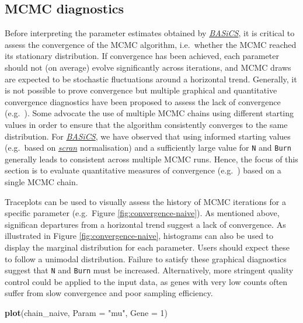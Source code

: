 \documentclass[9pt,a4paper,]{extarticle}
\newenvironment{Shaded}{\begin{snugshade}}{\end{snugshade}}
\newcommand{\DataTypeTok}[1]{\textcolor[rgb]{0.13,0.29,0.53}{#1}}
\newcommand{\DecValTok}[1]{\textcolor[rgb]{0.00,0.00,0.81}{#1}}
\newcommand{\KeywordTok}[1]{\textcolor[rgb]{0.13,0.29,0.53}{\textbf{#1}}}
\newcommand{\NormalTok}[1]{#1}
\newcommand{\StringTok}[1]{\textcolor[rgb]{0.31,0.60,0.02}{#1}}
\begin{document}
\hypertarget{mcmc-diagnostics}{%
\subsection{MCMC diagnostics}\label{mcmc-diagnostics}}

Before interpreting the parameter estimates obtained by \emph{\href{https://bioconductor.org/packages/3.11/BASiCS}{BASiCS}},
it is critical to assess the convergence of the MCMC algorithm, i.e.~whether
the MCMC reached its stationary distribution.
If convergence has been achieved, each parameter should not (on average) evolve
significantly across iterations, and MCMC draws are expected to be stochastic
fluctuations around a horizontal trend.
Generally, it is not possible to prove convergence but multiple graphical and
quantitative convergence diagnostics have been proposed to assess the lack
of convergence (e.g.~\citep{CowlesCarlin1996, BrooksGelman1998}).
Some advocate the use of multiple MCMC chains using different starting values in
order to ensure that the algorithm consistently converges to the same
distribution.
For \emph{\href{https://bioconductor.org/packages/3.11/BASiCS}{BASiCS}}, we have observed that using informed starting values
(e.g.~based on \emph{\href{https://bioconductor.org/packages/3.11/scran}{scran}} normalisation) and a sufficiently large
value for \texttt{N} and \texttt{Burn} generally leads to consistent across multiple MCMC runs.
Hence, the focus of this section is to evaluate quantitative measures of
convergence (e.g.~\citep{Geweke1995}) based on a single MCMC chain.

Traceplots can be used to visually assess the history of MCMC iterations
for a specific parameter (e.g.~Figure \ref{fig:convergence-naive}).
As mentioned above, significan departures from a horizontal trend suggest a
lack of convergence.
As illustrated in Figure \ref{fig:convergence-naive}, histograms can also be
used to display the marginal distribution for each parameter.
Users should expect these to follow a unimodal distribution.
Failure to satisfy these graphical diagnostics suggest that \texttt{N} and \texttt{Burn} must
be increased.
Alternatively, more stringent quality control could be applied to the input
data, as genes with very low counts often suffer from slow convergence and poor sampling efficiency.

\begin{Shaded}
\begin{Highlighting}[]
\KeywordTok{plot}\NormalTok{(chain_naive, }\DataTypeTok{Param =} \StringTok{"mu"}\NormalTok{, }\DataTypeTok{Gene =} \DecValTok{1}\NormalTok{)}
\end{Highlighting}
\end{Shaded}
\end{document}
